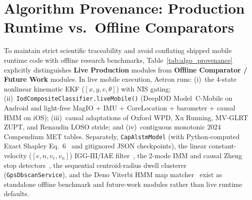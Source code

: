 \section{Algorithm Provenance: Production Runtime vs.\ Offline Comparators}
\label{sec:algo_provenance}
To maintain strict scientific traceability and avoid conflating shipped mobile runtime code with offline research benchmarks, Table~\ref{tab:algo_provenance} explicitly distinguishes \textbf{Live Production} modules from \textbf{Offline Comparator / Future Work} modules. In live mobile execution, Aetron runs: (i)~the 4-state nonlinear kinematic EKF ($[x, y, v, \theta]$) with NIS gating; (ii)~\texttt{IodCompositeClassifier.liveMobile()} (DeepIOD Model~C-Mobile on Android and light-free MagIO + IMU + CoreLocation + barometer + causal HMM on iOS); (iii)~causal adaptations of Oxford WPD, Xu Running, MV-GLRT ZUPT, and Renaudin LOSO stride; and (iv)~contiguous monotonic 2024 Compendium MET tables. Separately, \texttt{CapAlstmModel} (with Python-computed Exact Shapley Eq.~6~\cite{bakirtzis2022ciod} and gitignored JSON checkpoints), the linear constant-velocity ($[e, n, v_e, v_n]$) IGG-III/IAE filter~\cite{yang2001igg3,mohamed1999iae}, the 2-mode IMM and causal Zheng stop detectors~\cite{blom1988imm,zheng2009mining}, the sequential centroid-radius dwell clusterer (\texttt{GpsDbscanService}), and the Deno Viterbi HMM map matcher~\cite{newson2009hidden} exist as standalone offline benchmark and future-work modules rather than live runtime defaults.

